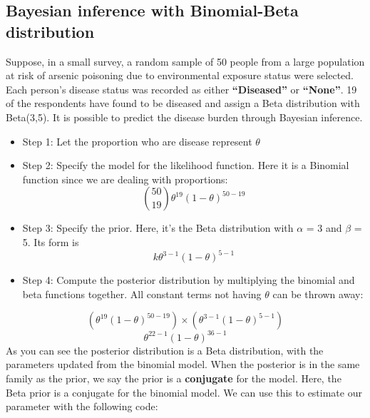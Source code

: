 \documentclass[
]{book}
\begin{document}
\hypertarget{bayesian-inference-with-binomial-beta-distribution}{%
\subsection{Bayesian inference with Binomial-Beta distribution}\label{bayesian-inference-with-binomial-beta-distribution}}

Suppose, in a small survey, a random sample of 50 people from a large population at risk of arsenic poisoning due to environmental exposure status were selected. Each person's disease status was recorded as either \textbf{``Diseased''} or \textbf{``None''}. 19 of the respondents have found to be diseased and assign a Beta distribution with Beta(3,5). It is possible to predict the disease burden through Bayesian inference.

\begin{itemize}
\item
  Step 1: Let the proportion who are disease represent \(\theta\)
\item
  Step 2: Specify the model for the likelihood function. Here it is a Binomial function since we are dealing with proportions:
  \[\binom{50}{19}\theta^{19}(1-\theta)^{50-19}\]
\item
  Step 3: Specify the prior. Here, it's the Beta distribution with \(\alpha\) = 3 and \(\beta\) = 5. Its form is \[k\theta^{3-1}(1-\theta)^{5-1}\]
\item
  Step 4: Compute the posterior distribution by multiplying the binomial and beta functions together. All constant terms not having \(\theta\) can be thrown away:
\end{itemize}

\[(\theta^{19}(1-\theta)^{50-19}) \times (\theta^{3-1}(1-\theta)^{5-1})\]
\[\theta^{22-1}(1-\theta)^{36-1}\]
As you can see the posterior distribution is a Beta distribution, with the parameters updated from the binomial model. When the posterior is in the same family as the prior, we say the prior is a \textbf{conjugate} for the model. Here, the Beta prior is a conjugate for the binomial model. We can use this to estimate our parameter with the following code:
\end{document}
